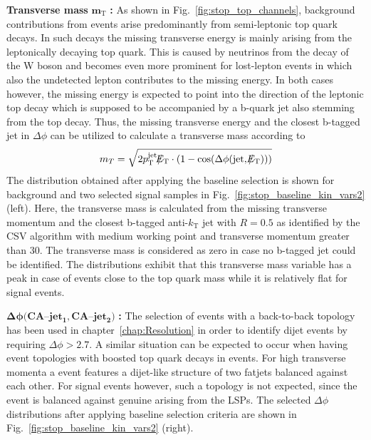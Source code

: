\begin{description}
 \item \textbf{Transverse mass} $\mathbf{m_\mathrm{T}}$ \textbf{:} As shown in Fig.~\ref{fig:stop_top_channels}, background contributions from \ttbar events arise predominantly from semi-leptonic top quark decays. In such decays the missing transverse energy is mainly arising from the leptonically decaying top quark. This is caused by neutrinos from the decay of the W boson and becomes even more prominent for lost-lepton events in which also the undetected lepton contributes to the missing energy. In both cases however, the missing energy is expected to point into the direction of the leptonic top decay which is supposed to be accompanied by a b-quark jet also stemming from the top decay. Thus, the missing transverse energy and the closest b-tagged jet in $\Delta \phi$ can be utilized to calculate a transverse mass according to
\begin{equation}
m_T = \sqrt{2 p_{\text{T}}^\mathrm{jet}\slash\mkern-12mu{E}_{\text{T}} \cdot (1-\mathrm{cos}(\Delta \phi(\mathrm{jet}, \slash\mkern-12mu{E}_{\text{T}})))}
\end{equation}   
The distribution obtained after applying the baseline selection is shown for background and two selected signal samples in Fig.~\ref{fig:stop_baseline_kin_vars2} (left). Here, the transverse mass is calculated from the missing transverse momentum and the closest b-tagged anti-$k_\mathrm{T}$ jet with $R = 0.5$ as identified by the CSV algorithm with medium working point and transverse momentum greater than 30\gev. The transverse mass is considered as zero in case no b-tagged jet could be identified. The distributions exhibit that this transverse mass variable has a peak in case of \ttbar events close to the top quark mass while it is relatively flat for signal events. 
 \item $\mathbf{\Delta \phi(CA}$--$\mathbf{jet_1, CA}$--$\mathbf{jet_2)}$ \textbf{:} The selection of events with a back-to-back topology has been used in chapter~\ref{chap:Resolution} in order to identify dijet events by requiring $\Delta \phi > 2.7$. A similar situation can be expected to occur when having event topologies with boosted top quark decays in \ttbar events. For high transverse momenta a \ttbar event features a dijet-like structure of two fatjets balanced against each other. For signal events however, such a topology is not expected, since the event is balanced against genuine \met arising from the LSPs. The selected $\Delta \phi$ distributions after applying baseline selection criteria are shown in Fig.~\ref{fig:stop_baseline_kin_vars2} (right).  
\end{description}
